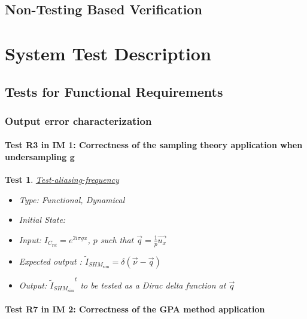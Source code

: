 \documentclass[12pt, titlepage]{article}
\newtheorem{Test}{Test}
\begin{document}

\subsection{Non-Testing Based Verification}


\section{System Test Description}
	
\subsection{Tests for Functional Requirements}
\renewcommand{\labelitemi}{$\star$}

\subsubsection{Output error characterization}
	
\paragraph{Test R3 in IM 1: Correctness of the sampling theory application when undersampling g}

\begin{Test}\normalfont\underline{Test-aliasing-frequency}
\begin{itemize}
\item Type: Functional, Dynamical
\item Initial State: 
\item Input: $I_{C_{\text{ref}}}=e^{2i\pi gx}$, $p$ such that $\overrightarrow{q}=\frac{1}{p}\vec{u_x}$
\item Expected output : $\widetilde{I}_{\mathit{SHM}_{\text{sim}}}=\delta(\vec{\nu}-\vec{q})$
\item Output: ${\widetilde{I}_{\mathit{SHM}_{\text{sim}}}}^{t}$ to be tested as a Dirac delta function at $\overrightarrow{q}$
\end{itemize}
\end{Test}
		
\paragraph{Test R7 in IM 2: Correctness of the GPA method application} 
\end{document}
